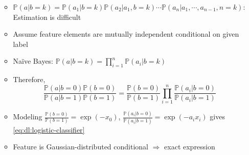 \begin{itemize}
\begin{itemize}
\begin{equation}
        \end{equation}
        \item $\mathbb{P}(a|b=k)=\mathbb{P}(a_1|b=k)\mathbb{P}(a_2|a_1,b=k)\cdots\mathbb{P}(a_n|a_1,\cdots,a_{n-1},n=k)$: Estimation is difficult
        \item Assume feature elements are mutually independent conditional on given label
        \item Na\"ive Bayes: $\mathbb{P}(a|b=k)=\prod_{i=1}^{n}\mathbb{P}(a_i|b=k)$
        \item Therefore,
        \begin{equation}
            \frac{\mathbb{P}(a|b=0)\mathbb{P}(b=0)}{\mathbb{P}(a|b=1)\mathbb{P}(b=1)}=\frac{\mathbb{P}(b=0)}{\mathbb{P}(b=1)}\prod_{i=1}^n\frac{\mathbb{P}(a_i|b=0)}{\mathbb{P}(a_i|b=1)}
        \end{equation}
        \item Modeling $\frac{\mathbb{P}(b=0)}{\mathbb{P}(b=1)}=\exp(-x_0)$, $\frac{\mathbb{P}(a_i|b=0)}{\mathbb{P}(a_i|b=1)}=\exp(-a_ix_i)$ gives \ref{eq:dl:logistic-classifier}
        \item Feature is Gaussian-distributed conditional $\Rightarrow$ exact expression
    \end{itemize}
\end{itemize}

